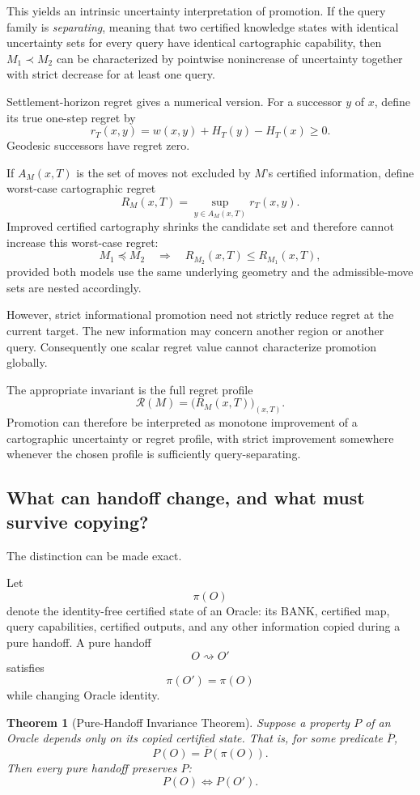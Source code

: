 \documentclass[11pt]{article}
\newtheorem{theorem}{Theorem}[section]
\newcommand{\BANK}{\mathrm{BANK}}
\begin{document}
This yields an intrinsic uncertainty interpretation of promotion. If the query family is \emph{separating}, meaning that two certified knowledge states with identical uncertainty sets for every query have identical cartographic capability, then $M_1\prec M_2$ can be characterized by pointwise nonincrease of uncertainty together with strict decrease for at least one query.

Settlement-horizon regret gives a numerical version. For a successor $y$ of $x$, define its true one-step regret by
\[
r_T(x,y)=w(x,y)+H_T(y)-H_T(x)\ge0.
\]
Geodesic successors have regret zero.

If $A_M(x,T)$ is the set of moves not excluded by $M$'s certified information, define worst-case cartographic regret
\[
R_M(x,T)=\sup_{y\in A_M(x,T)}r_T(x,y).
\]
Improved certified cartography shrinks the candidate set and therefore cannot increase this worst-case regret:
\[
M_1\preceq M_2
\quad\Longrightarrow\quad
R_{M_2}(x,T)\le R_{M_1}(x,T),
\]
provided both models use the same underlying geometry and the admissible-move sets are nested accordingly.

However, strict informational promotion need not strictly reduce regret at the current target. The new information may concern another region or another query. Consequently one scalar regret value cannot characterize promotion globally.

The appropriate invariant is the full regret profile
\[
\mathcal R(M)=\bigl(R_M(x,T)\bigr)_{(x,T)}.
\]
Promotion can therefore be interpreted as monotone improvement of a cartographic uncertainty or regret profile, with strict improvement somewhere whenever the chosen profile is sufficiently query-separating.

\subsection{What can handoff change, and what must survive copying?}
The distinction can be made exact.

Let
\[
\pi(O)
\]
denote the identity-free certified state of an Oracle: its $\BANK$, certified map, query capabilities, certified outputs, and any other information copied during a pure handoff. A pure handoff
\[
O\rightsquigarrow O'
\]
satisfies
\[
\pi(O')=\pi(O)
\]
while changing Oracle identity.

\begin{theorem}[Pure-Handoff Invariance Theorem]
Suppose a property $P$ of an Oracle depends only on its copied certified state. That is, for some predicate $\overline P$,
\[
P(O)=\overline P(\pi(O)).
\]
Then every pure handoff preserves $P$:
\[
P(O)\Longleftrightarrow P(O').
\]
\end{theorem}
\end{document}
